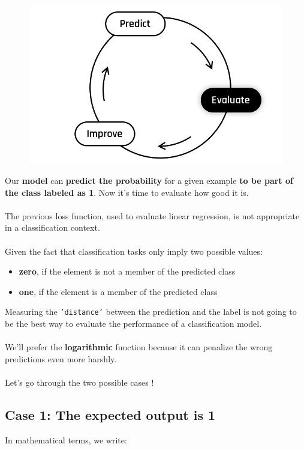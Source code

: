 \begin{figure}[!h]
    \centering
    \includegraphics[scale=0.25]{assets/Evaluate.png}
\end{figure}
Our \textbf{model} can \textbf{predict the probability} for a given example \textbf{to be part of the class labeled as 1}.  
Now it's time to evaluate how good it is.\\
\\
The previous loss function, used to evaluate linear regression, is not appropriate in a classification context.\\
\\
Given the fact that classification tasks only imply two possible values:
\begin{itemize}
    \item \textbf{zero}, if the element is not a member of the predicted class
    \item \textbf{one}, if the element is a member of the predicted class
\end{itemize}
Measuring the \texttt{'distance'} between the prediction and the label 
is not going to be the best way to evaluate the performance of a classification model.\\
\\
We'll prefer the \textbf{logarithmic} function because it can penalize the wrong 
predictions even more harshly.\\
\\
Let's go through the two possible cases !

\newpage

\subsection*{Case 1: The expected output is 1}
In mathematical terms, we write:

